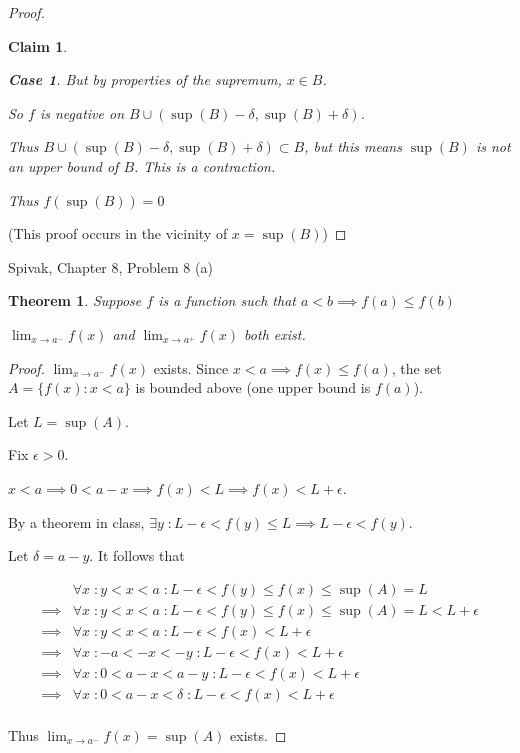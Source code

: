 \documentclass{article} %
\theoremstyle{plain}
\newtheorem*{theorem*}{Theorem}
\newtheorem*{claim*}{Claim}
\newtheorem{case}{Case}
\theoremstyle{definition}
\begin{document}
\begin{proof}
\begin{claim*}
\begin{case}
            But by properties of the supremum, $x \in B$.

            So $f$ is negative on $B \cup (\sup(B) - \delta, \sup(B) + \delta)$.

            Thus $B \cup (\sup(B) - \delta, \sup(B) + \delta) \subset B$, but this means $\sup(B)$ is not an upper bound of $B$.  This is a contraction.
        \end{case}

        Thus $f(\sup(B)) = 0$
    \end{claim*}

    (This proof occurs in the vicinity of $x = \sup(B)$)
\end{proof} 

\noindent{} Spivak, Chapter 8, Problem 8 (a)

\begin{theorem*} Suppose $f$ is a function such that $a < b \implies f(a) \leq f(b)$

    $\lim_{x \to a^-} f(x)$ and $\lim_{x \to a^+} f(x)$ both exist. 
\end{theorem*}

\begin{proof} $\lim_{x \to a^-} f(x)$ exists. 
    Since $x<a \implies f(x) \leq f(a)$, the set $A = \{f(x) : x < a \}$ is bounded above (one upper bound is $f(a)$).

    Let $L = \sup(A)$.

    Fix $\epsilon > 0$.

    $x < a \implies 0 < a-x \implies f(x) < L \implies f(x) < L + \epsilon$.

    By a theorem in class, $\exists y \; \colon L - \epsilon < f(y) \leq L \implies L - \epsilon < f(y)$.

    Let $\delta = a -y$. It follows that

    \begin{align*}
        & \forall x \; \colon y < x < a \; \colon L - \epsilon < f(y) \leq f(x) \leq \sup(A) = L \\
        \implies & \forall x \; \colon y < x < a \; \colon L - \epsilon < f(y) \leq f(x) \leq \sup(A) = L < L + \epsilon \\
        \implies & \forall x \; \colon y < x < a \; \colon L - \epsilon < f(x) < L + \epsilon \\
        \implies & \forall x \; \colon -a < -x < -y \; \colon L - \epsilon < f(x) < L + \epsilon \\
        \implies & \forall x \; \colon 0 < a-x < a-y \; \colon L - \epsilon < f(x) < L + \epsilon \\
        \implies & \forall x \; \colon 0 < a-x < \delta \; \colon L - \epsilon < f(x) < L + \epsilon \\
    \end{align*}

    Thus $\lim_{x \to a^-} f(x) = \sup(A)$ exists.
\end{proof} 
\end{document}
